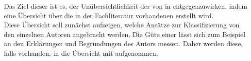 Das Ziel dieser \BA ist es, der Unübersichtlichkeit der \KAS von \EF in 
\ISPS entgegenzuwirken, indem eine Übersicht über die in der Fachliteratur vorhandenen \KAS erstellt wird.\\
Diese Übersicht soll zunächst aufzeigen, welche Ansätze zur Klassifizierung von den einzelnen Autoren angebracht werden.
Die Güte einer \KA lässt sich zum Beispiel an den Erklärungen und Begründungen des Autors messen. Daher werden diese, falls vorhanden, in die
Übersicht mit aufgenommen.